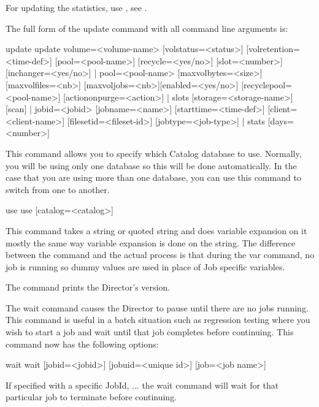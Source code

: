 \begin{description}
   For updating the statistics, use , see .

   The full form of the update command with all command line arguments is:

\begin{bconsole}{update}
update  volume=<volume-name> [volstatus=<status>]
        [volretention=<time-def>] [pool=<pool-name>]
        [recycle=<yes/no>] [slot=<number>] [inchanger=<yes/no>] |
        pool=<pool-name> [maxvolbytes=<size>] [maxvolfiles=<nb>]
        [maxvoljobs=<nb>][enabled=<yes/no>] [recyclepool=<pool-name>]
        [actiononpurge=<action>] |
        slots [storage=<storage-name>] [scan] |
        jobid=<jobid> [jobname=<name>] [starttime=<time-def>]
        [client=<client-name>] [filesetid=<fileset-id>]
        [jobtype=<job-type>] |
        stats [days=<number>]
\end{bconsole}


\item [use]
   This command allows you to specify which Catalog  database to use. Normally,
   you will be using only one database so  this will be done automatically. In
   the case that you are using  more than one database, you can use this command
   to switch from  one to another.

\begin{bconsole}{use}
use [catalog=<catalog>]
\end{bconsole}

\item [var]
   \label{var}
   This command takes a string or quoted string and does variable expansion on
   it mostly the same way variable expansion is done on the  string.
   The difference  between the  command and the actual  process
   is that during the var command, no job is running so dummy values are
   used in place of Job specific variables.

\item [version]
   The command prints the Director's version.

\item [wait]
   The wait command causes the Director to pause  until there are no jobs
   running. This command is useful in  a batch situation such as regression
   testing where you  wish to start a job and wait until that job completes
   before continuing. This command now has the following options:

\begin{bconsole}{wait}
wait [jobid=<jobid>] [jobuid=<unique id>] [job=<job name>]
\end{bconsole}

   If specified with a specific JobId, ... the wait command will wait
   for that particular job to terminate before continuing.

\end{description}

